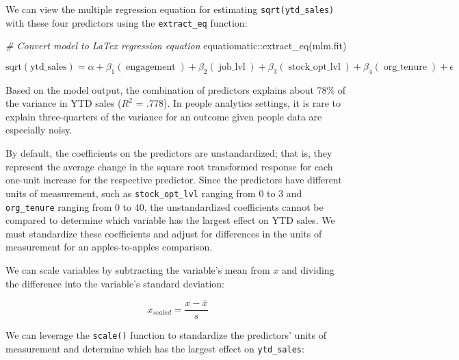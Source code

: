 \documentclass[
]{book}
\newenvironment{Shaded}{\begin{snugshade}}{\end{snugshade}}
\newcommand{\CommentTok}[1]{\textcolor[rgb]{0.56,0.35,0.01}{\textit{#1}}}
\newcommand{\FunctionTok}[1]{\textcolor[rgb]{0.00,0.00,0.00}{#1}}
\newcommand{\NormalTok}[1]{#1}
\newcommand{\SpecialCharTok}[1]{\textcolor[rgb]{0.00,0.00,0.00}{#1}}
\begin{document}
We can view the multiple regression equation for estimating \texttt{sqrt(ytd\_sales)} with these four predictors using the \texttt{extract\_eq} function:

\begin{Shaded}
\begin{Highlighting}[]
\CommentTok{\# Convert model to LaTex regression equation}
\NormalTok{equatiomatic}\SpecialCharTok{::}\FunctionTok{extract\_eq}\NormalTok{(mlm.fit)}
\end{Highlighting}
\end{Shaded}

\begin{equation}
\operatorname{sqrt(ytd\_sales)} = \alpha + \beta_{1}(\operatorname{engagement}) + \beta_{2}(\operatorname{job\_lvl}) + \beta_{3}(\operatorname{stock\_opt\_lvl}) + \beta_{4}(\operatorname{org\_tenure}) + \epsilon
\end{equation}

Based on the model output, the combination of predictors explains about 78\% of the variance in YTD sales (\(R^2\) = .778). In people analytics settings, it is rare to explain three-quarters of the variance for an outcome given people data are especially noisy.

By default, the coefficients on the predictors are unstandardized; that is, they represent the average change in the square root transformed response for each one-unit increase for the respective predictor. Since the predictors have different units of measurement, such as \texttt{stock\_opt\_lvl} ranging from 0 to 3 and \texttt{org\_tenure} ranging from 0 to 40, the unstandardized coefficients cannot be compared to determine which variable has the largest effect on YTD sales. We must standardize these coefficients and adjust for differences in the units of measurement for an apples-to-apples comparison.

We can scale variables by subtracting the variable's mean from \(x\) and dividing the difference into the variable's standard deviation:

\[ x_{scaled} = \frac{x - \bar{x}} {s} \]

We can leverage the \texttt{scale()} function to standardize the predictors' units of measurement and determine which has the largest effect on \texttt{ytd\_sales}:
\end{document}
